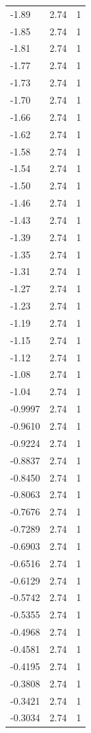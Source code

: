 \begin{longtable}{lrr}
  -1.89 & 2.74 & 1 \\
  -1.85 & 2.74 & 1 \\
  -1.81 & 2.74 & 1 \\
  -1.77 & 2.74 & 1 \\
  -1.73 & 2.74 & 1 \\
  -1.70 & 2.74 & 1 \\
  -1.66 & 2.74 & 1 \\
  -1.62 & 2.74 & 1 \\
  -1.58 & 2.74 & 1 \\
  -1.54 & 2.74 & 1 \\
  -1.50 & 2.74 & 1 \\
  -1.46 & 2.74 & 1 \\
  -1.43 & 2.74 & 1 \\
  -1.39 & 2.74 & 1 \\
  -1.35 & 2.74 & 1 \\
  -1.31 & 2.74 & 1 \\
  -1.27 & 2.74 & 1 \\
  -1.23 & 2.74 & 1 \\
  -1.19 & 2.74 & 1 \\
  -1.15 & 2.74 & 1 \\
  -1.12 & 2.74 & 1 \\
  -1.08 & 2.74 & 1 \\
  -1.04 & 2.74 & 1 \\
  -0.9997 & 2.74 & 1 \\
  -0.9610 & 2.74 & 1 \\
  -0.9224 & 2.74 & 1 \\
  -0.8837 & 2.74 & 1 \\
  -0.8450 & 2.74 & 1 \\
  -0.8063 & 2.74 & 1 \\
  -0.7676 & 2.74 & 1 \\
  -0.7289 & 2.74 & 1 \\
  -0.6903 & 2.74 & 1 \\
  -0.6516 & 2.74 & 1 \\
  -0.6129 & 2.74 & 1 \\
  -0.5742 & 2.74 & 1 \\
  -0.5355 & 2.74 & 1 \\
  -0.4968 & 2.74 & 1 \\
  -0.4581 & 2.74 & 1 \\
  -0.4195 & 2.74 & 1 \\
  -0.3808 & 2.74 & 1 \\
  -0.3421 & 2.74 & 1 \\
  -0.3034 & 2.74 & 1 \\

\end{longtable}
